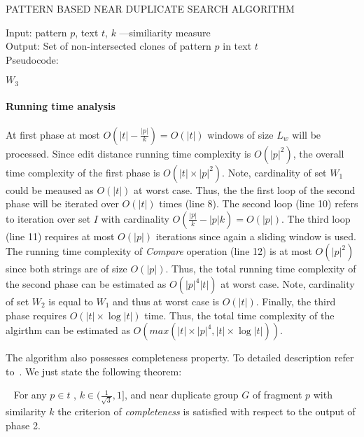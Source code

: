 \begin{algorithm}[!t]
\caption{PATTERN BASED NEAR DUPLICATE
SEARCH ALGORITHM}\cite{}
\label{alg:luciv}
Input: pattern $p$, text $t$, $k$ ---similiarity measure\\
Output: Set of non-intersected clones of pattern $p$ in text $t$\\
Pseudocode:
\begin{algorithmic}[1]
\ENDIF
\ENDFOR
{}

\ENDIF
\ENDFOR
\ENDFOR
{}
\ENDFOR


\ENDIF
\ENDFOR
\RETURN $W_3$

\end{algorithmic}
\end{algorithm}

\paragraph{Running time analysis}
At first phase at most $O(|t|-\frac{|p|}{k})=O(|t|)$ windows of size $L_{w}$ will be processed.
Since edit distance running time complexity is $O(|p|^2)$, the overall time complexity of the first phase is $O(|t| \times |p|^2)$.
Note, cardinality of set $W_{1}$ could be meaused as $O(|t|)$ at worst case.
Thus, the the first loop of the second phase will be iterated over $O(|t|)$ times (line 8).
The second loop (line 10) refers to iteration over set $I$ with cardinality $O(\frac{|p|}{k}-|p|k) = O(|p|)$.
The third loop (line 11) requires at most $O(|p|)$ iterations since again a sliding window is used.
The running time complexity of \emph{Compare} operation (line 12) is at most $O(|p|^2)$ since both strings are of size $O(|p|)$.
Thus, the total running time complexity of the second phase can be estimated as $O(|p|^4|t|)$ at worst case.
Note, cardinality of set $W_{2}$ is equal to $W_{1}$ and thus at worst case is $O(|t|)$.
Finally, the third phase requires $O(|t| \times \log |t|)$ time.
Thus, the total time complexity of the algirthm can be estimated as
$O(max(|t| \times |p|^4, |t| \times \log|t|))$.

The algorithm also possesses completeness property.
To detailed description refer to~\cite{.}.
We just state the following theorem:
\begin{theorem}~\cite{Luciv}
For any $p \in t$ , $k \in (\frac{1}{ \sqrt{3}} , 1]$, and near duplicate group $G$ of fragment $p$ with similarity $k$ the criterion of \emph{completeness} is satisfied with respect to the output of phase 2.
\end{theorem}
